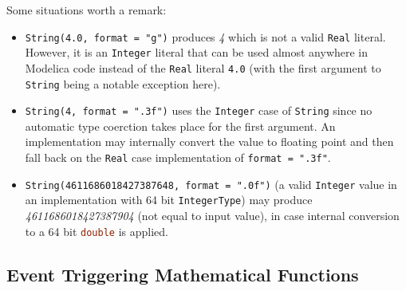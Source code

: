 \begin{operatordefinition*}[String]
\begin{semantics}
\begin{example}
Some situations worth a remark:
\begin{itemize}
\item
  \lstinline!String(4.0, format = "g")! produces \emph{4} which is not a valid \lstinline!Real! literal.
  However, it is an \lstinline!Integer! literal that can be used almost anywhere in Modelica code instead of the \lstinline!Real! literal \lstinline{4.0} (with the first argument to \lstinline!String! being a notable exception here).
\item
  \lstinline!String(4, format = ".3f")! uses the \lstinline!Integer! case of \lstinline!String! since no automatic type coerction takes place for the first argument.
  An implementation may internally convert the value to floating point and then fall back on the \lstinline!Real! case implementation of \lstinline!format = ".3f"!.
\item
  \lstinline!String(4611686018427387648, format = ".0f")! (a valid \lstinline!Integer! value in an implementation with 64 bit \lstinline!IntegerType!) may produce \emph{4611686018427387904} (not equal to input value), in case internal conversion to a 64 bit \lstinline[language=C]!double! is applied.
\end{itemize}
\end{example}
\end{semantics}
\end{operatordefinition*}


\subsection{Event Triggering Mathematical Functions}\label{event-triggering-mathematical-functions}


